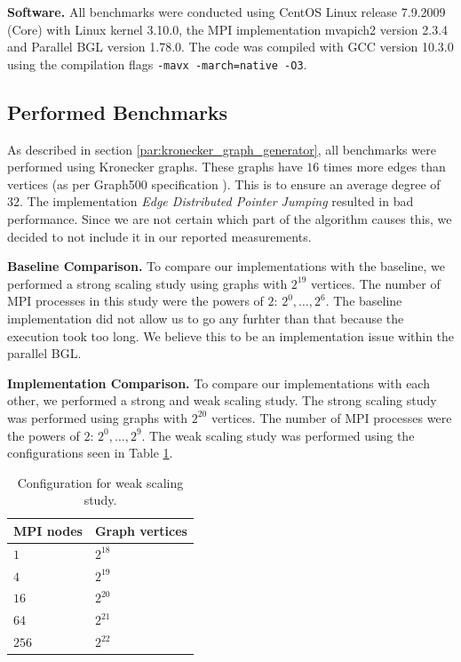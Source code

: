 \documentclass[letterpaper]{article}
\newcommand{\mypar}[1]{{\bf #1.}}
\begin{document}
\mypar{Software}
All benchmarks were conducted using CentOS Linux release 7.9.2009 (Core) with Linux kernel 3.10.0, the MPI
implementation mvapich2 version 2.3.4 and Parallel BGL version 1.78.0. The code was compiled with GCC version 10.3.0
using the compilation flags
\lstinline[basicstyle=\ttfamily\color{black},identifierstyle=\color{black}]|-mavx -march=native -O3|.

\subsection{Performed Benchmarks}
As described in section \ref{par:kronecker_graph_generator}, all benchmarks were performed using Kronecker graphs. These
graphs have $16$ times more edges than vertices (as per Graph500 specification \cite{graph500}). This is to ensure an
average degree of $32$. The implementation \emph{Edge Distributed Pointer Jumping} resulted in bad performance.
Since we are not certain which part of the algorithm causes this, we decided to not include it in our reported
measurements. %

\mypar{Baseline Comparison}
To compare our implementations with the baseline, we performed a strong scaling study using graphs with $2^{19}$
vertices. The number of MPI processes in this study were the powers of $2$: $2^0, \dotsc, 2^6$. The baseline
implementation did not allow us to go any furhter than that because the execution took too long. We believe this to be
an implementation issue within the parallel BGL.

\mypar{Implementation Comparison}
To compare our implementations with each other, we performed a strong and weak scaling study. The strong scaling study
was performed using graphs with $2^{20}$ vertices. The number of MPI processes were the powers of $2$: $2^0, \dotsc,
2^9$. The weak scaling study was performed using the configurations seen in Table \ref{tab:weakscaling-table}.

\begin{table}[!t]
  \centering
  \begin{tabular}{l l}
    \toprule
    \textbf{MPI nodes} & \textbf{Graph vertices} \\ \midrule
    $1$ & $2^{18}$ \\ 
    $4$ & $2^{19}$ \\ 
    $16$ & $2^{20}$ \\
    $64$ & $2^{21}$ \\
    $256$ & $2^{22}$ \\ \bottomrule
  \end{tabular}
  \caption{Configuration for weak scaling study.}
  \label{tab:weakscaling-table}
\end{table}
\end{document}
